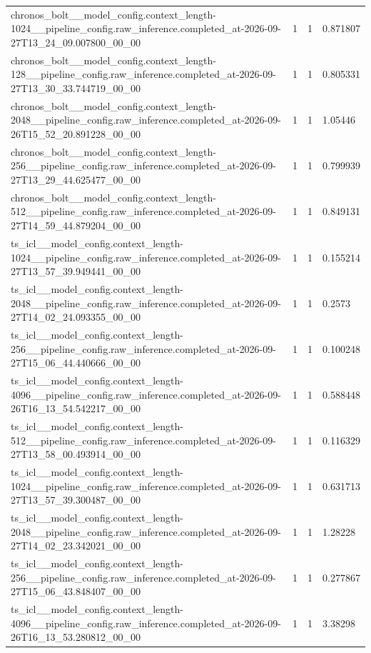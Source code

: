 \begin{tabular}{llll}
chronos\_bolt\_\_model\_config.context\_length-1024\_\_pipeline\_config.raw\_inference.completed\_at-2026-09-27T13\_24\_09.007800\_00\_00 & 1 & 1 & 0.871807 \\
chronos\_bolt\_\_model\_config.context\_length-128\_\_pipeline\_config.raw\_inference.completed\_at-2026-09-27T13\_30\_33.744719\_00\_00 & 1 & 1 & 0.805331 \\
chronos\_bolt\_\_model\_config.context\_length-2048\_\_pipeline\_config.raw\_inference.completed\_at-2026-09-26T15\_52\_20.891228\_00\_00 & 1 & 1 & 1.05446 \\
chronos\_bolt\_\_model\_config.context\_length-256\_\_pipeline\_config.raw\_inference.completed\_at-2026-09-27T13\_29\_44.625477\_00\_00 & 1 & 1 & 0.799939 \\
chronos\_bolt\_\_model\_config.context\_length-512\_\_pipeline\_config.raw\_inference.completed\_at-2026-09-27T14\_59\_44.879204\_00\_00 & 1 & 1 & 0.849131 \\
ts\_icl\_\_model\_config.context\_length-1024\_\_pipeline\_config.raw\_inference.completed\_at-2026-09-27T13\_57\_39.949441\_00\_00 & 1 & 1 & 0.155214 \\
ts\_icl\_\_model\_config.context\_length-2048\_\_pipeline\_config.raw\_inference.completed\_at-2026-09-27T14\_02\_24.093355\_00\_00 & 1 & 1 & 0.2573 \\
ts\_icl\_\_model\_config.context\_length-256\_\_pipeline\_config.raw\_inference.completed\_at-2026-09-27T15\_06\_44.440666\_00\_00 & 1 & 1 & 0.100248 \\
ts\_icl\_\_model\_config.context\_length-4096\_\_pipeline\_config.raw\_inference.completed\_at-2026-09-26T16\_13\_54.542217\_00\_00 & 1 & 1 & 0.588448 \\
ts\_icl\_\_model\_config.context\_length-512\_\_pipeline\_config.raw\_inference.completed\_at-2026-09-27T13\_58\_00.493914\_00\_00 & 1 & 1 & 0.116329 \\
ts\_icl\_\_model\_config.context\_length-1024\_\_pipeline\_config.raw\_inference.completed\_at-2026-09-27T13\_57\_39.300487\_00\_00 & 1 & 1 & 0.631713 \\
ts\_icl\_\_model\_config.context\_length-2048\_\_pipeline\_config.raw\_inference.completed\_at-2026-09-27T14\_02\_23.342021\_00\_00 & 1 & 1 & 1.28228 \\
ts\_icl\_\_model\_config.context\_length-256\_\_pipeline\_config.raw\_inference.completed\_at-2026-09-27T15\_06\_43.848407\_00\_00 & 1 & 1 & 0.277867 \\
ts\_icl\_\_model\_config.context\_length-4096\_\_pipeline\_config.raw\_inference.completed\_at-2026-09-26T16\_13\_53.280812\_00\_00 & 1 & 1 & 3.38298 \\

\end{tabular}
